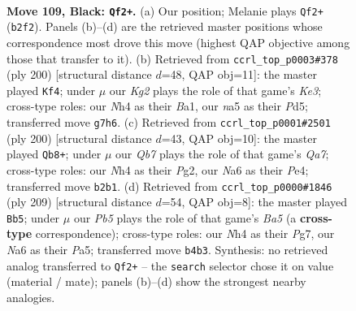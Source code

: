 \documentclass[11pt]{article}
\begin{document}
\clearpage

\begin{figure}[p]\centering
\begin{subfigure}{0.46\textwidth}\centering
\resizebox{\linewidth}{!}{%
\newchessgame
\chessboard[
  setfen={8/6k1/n7/N7/PpB1P2n/4b3/1q5p/4K3 b - - 11 109},
  showmover=false,
  pgfstyle=straightmove, color=movearrow, markmove={b2-f2}
]}
\caption{}
\end{subfigure}\hfill
\begin{subfigure}{0.46\textwidth}\centering
\resizebox{\linewidth}{!}{%
\newchessgame
\chessboard[
  setfen={8/3b4/4PQ2/2PP3k/8/4K3/p7/B7 w - - 5 101},
  showmover=false,
  pgfstyle=straightmove, color=movearrow, markmove={e3-f4}
]}
\caption{}
\end{subfigure}
\\[4pt]
\begin{subfigure}{0.46\textwidth}\centering
\resizebox{\linewidth}{!}{%
\newchessgame
\chessboard[
  setfen={3k4/Q4K2/2b4q/P7/4P1p1/1P6/6P1/8 w - - 19 101},
  showmover=false,
  pgfstyle=straightmove, color=movearrow, markmove={a7-b8}
]}
\caption{}
\end{subfigure}\hfill
\begin{subfigure}{0.46\textwidth}\centering
\resizebox{\linewidth}{!}{%
\newchessgame
\chessboard[
  setfen={6k1/6p1/8/p4P1n/b1N5/7P/7K/2N5 b - - 0 105},
  showmover=false,
  pgfstyle=straightmove, color=movearrow, markmove={a4-b5}
]}
\caption{}
\end{subfigure}
\caption{\textbf{Move 109, Black: \texttt{Qf2+}.} (a) Our position; Melanie plays \texttt{Qf2+} (\texttt{b2f2}). Panels (b)--(d) are the retrieved master positions whose correspondence most drove this move (highest QAP objective among those that transfer to it). (b) Retrieved from \texttt{ccrl\_top\_p0003\#378} (ply 200) [structural distance $d$=48, QAP obj=11]: the master played \texttt{Kf4}; under $\mu$ our \emph{Kg2} plays the role of that game's \emph{Ke3}; cross-type roles: our \emph{N}h4 as their \emph{B}a1, our \emph{n}a5 as their \emph{P}d5; transferred move \texttt{g7h6}. (c) Retrieved from \texttt{ccrl\_top\_p0001\#2501} (ply 200) [structural distance $d$=43, QAP obj=10]: the master played \texttt{Qb8+}; under $\mu$ our \emph{Qb7} plays the role of that game's \emph{Qa7}; cross-type roles: our \emph{N}h4 as their \emph{P}g2, our \emph{N}a6 as their \emph{P}e4; transferred move \texttt{b2b1}. (d) Retrieved from \texttt{ccrl\_top\_p0000\#1846} (ply 209) [structural distance $d$=54, QAP obj=8]: the master played \texttt{Bb5}; under $\mu$ our \emph{Pb5} plays the role of that game's \emph{Ba5} (a \textbf{cross-type} correspondence); cross-type roles: our \emph{N}h4 as their \emph{P}g7, our \emph{N}a6 as their \emph{P}a5; transferred move \texttt{b4b3}. Synthesis: no retrieved analog transferred to \texttt{Qf2+} -- the \texttt{search} selector chose it on value (material / mate); panels (b)--(d) show the strongest nearby analogies.}
\label{fig:thought-m217}
\end{figure}
\end{document}
